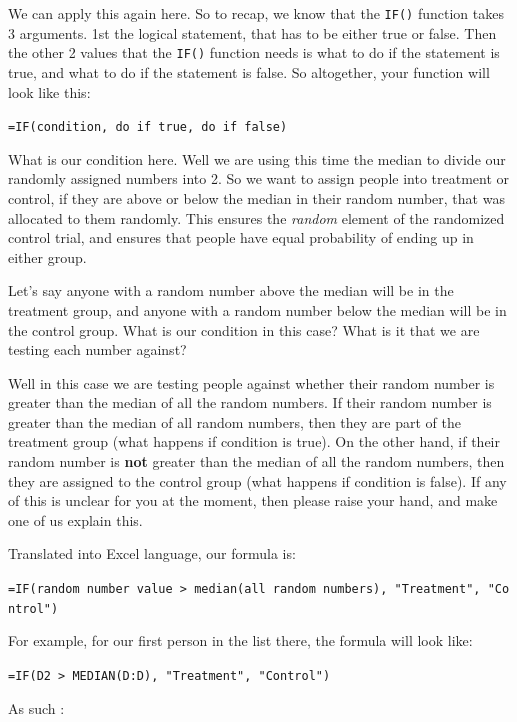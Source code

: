 \documentclass[]{book}
\theoremstyle{definition}
\theoremstyle{definition}
\theoremstyle{definition}
\theoremstyle{remark}
\begin{document}
We can apply this again here. So to recap, we know that the
\texttt{IF()} function takes 3 arguments. 1st the logical statement,
that has to be either true or false. Then the other 2 values that the
\texttt{IF()} function needs is what to do if the statement is true, and
what to do if the statement is false. So altogether, your function will
look like this:

\texttt{=IF(condition,\ do\ if\ true,\ do\ if\ false)}

What is our condition here. Well we are using this time the median to
divide our randomly assigned numbers into 2. So we want to assign people
into treatment or control, if they are above or below the median in
their random number, that was allocated to them randomly. This ensures
the \emph{random} element of the randomized control trial, and ensures
that people have equal probability of ending up in either group.

Let's say anyone with a random number above the median will be in the
treatment group, and anyone with a random number below the median will
be in the control group. What is our condition in this case? What is it
that we are testing each number against?

Well in this case we are testing people against whether their random
number is greater than the median of all the random numbers. If their
random number is greater than the median of all random numbers, then
they are part of the treatment group (what happens if condition is
true). On the other hand, if their random number is \textbf{not} greater
than the median of all the random numbers, then they are assigned to the
control group (what happens if condition is false). If any of this is
unclear for you at the moment, then please raise your hand, and make one
of us explain this.

Translated into Excel language, our formula is:

\texttt{=IF(random\ number\ value\ \textgreater{}\ median(all\ random\ numbers),\ "Treatment",\ "Control")}

For example, for our first person in the list there, the formula will
look like:

\texttt{=IF(D2\ \textgreater{}\ MEDIAN(D:D),\ "Treatment",\ "Control")}

As such :
\end{document}
